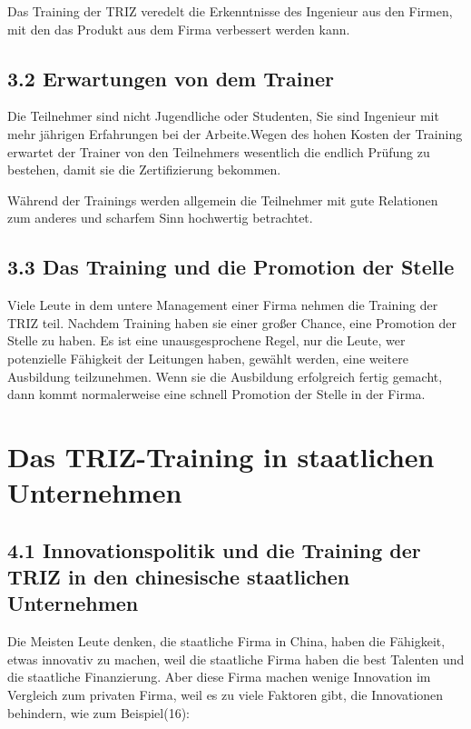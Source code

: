 \documentclass[11pt,a4paper]{article}
\begin{document}
Das Training der TRIZ veredelt die Erkenntnisse des Ingenieur aus den Firmen,
mit den das Produkt aus dem Firma verbessert werden kann.
  
\subsection{3.2 Erwartungen von dem Trainer}

Die Teilnehmer sind nicht Jugendliche oder Studenten, Sie sind Ingenieur mit
mehr jährigen Erfahrungen bei der Arbeite.Wegen des hohen Kosten der Training
erwartet der Trainer von den Teilnehmers wesentlich die endlich Prüfung zu
bestehen, damit sie die Zertifizierung bekommen.

Während der Trainings werden allgemein die Teilnehmer mit gute Relationen zum
anderes und scharfem Sinn  hochwertig betrachtet.


\subsection{3.3 Das Training und die Promotion der Stelle}

Viele Leute in dem untere Management einer Firma nehmen die Training der TRIZ
teil. Nachdem Training haben sie einer großer Chance, eine Promotion der
Stelle zu haben. Es ist eine unausgesprochene Regel, nur die Leute, wer
potenzielle Fähigkeit der Leitungen haben, gewählt werden, eine weitere
Ausbildung  teilzunehmen. Wenn sie die Ausbildung erfolgreich fertig gemacht,
dann kommt normalerweise eine schnell Promotion der Stelle in der Firma.  

\section{Das TRIZ-Training in staatlichen Unternehmen}

\subsection{4.1 Innovationspolitik und die Training der TRIZ in den chinesische
staatlichen Unternehmen}

Die Meisten Leute denken, die staatliche Firma in China, haben die Fähigkeit,
etwas innovativ zu machen, weil die staatliche Firma haben die best Talenten
und die staatliche Finanzierung. Aber diese Firma machen wenige Innovation im
Vergleich zum privaten Firma, weil es zu viele Faktoren gibt, die Innovationen
behindern, wie zum Beispiel(16):
\end{document}
